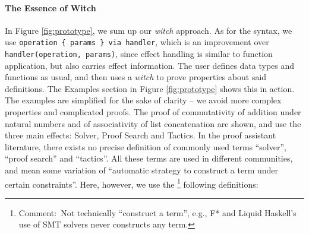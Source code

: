 \documentclass[sigconfl]{acmart}
\newcommand{\comment}[1]{\footnote{Comment:~#1}}
\begin{document}
\paragraph{The Essence of Witch}
In Figure \ref{fig:prototype}, we sum up our \textit{witch} approach.
As for the syntax, we use \texttt{operation \{ params \} via handler}, which is an
improvement over \texttt{handler(operation, params)}, since effect handling is similar
to function application, but also carries effect information.
The user defines data types and functions as usual, and then uses a
\textit{witch} to prove properties about said definitions. The Examples
section in Figure \ref{fig:prototype} shows this in action. The examples are
simplified for the sake of clarity -- we avoid
more complex properties and complicated proofs. The proof of
commutativity of addition under natural numbers and of associativity of list
concatenation are shown, and use the three main effects: Solver, Proof Search
and Tactics. In the proof assistant literature, there exists no precise
definition of commonly used terms ``solver'', ``proof search'' and ``tactics''.
All these terms are used in different communities, and mean some variation of ``automatic strategy to
construct a term under certain constraints''. Here, however, we use the
\comment{Not technically ``construct a term'', e.g., F* and Liquid Haskell's use
  of SMT solvers never constructs any term.}
following definitions:
\end{document}
